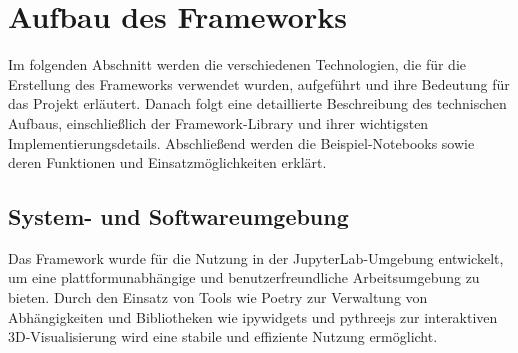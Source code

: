 \section{Aufbau des Frameworks}
Im folgenden Abschnitt werden die verschiedenen Technologien, die für die Erstellung des Frameworks verwendet wurden,
aufgeführt und ihre Bedeutung für das Projekt erläutert. Danach folgt eine detaillierte Beschreibung des technischen Aufbaus,
einschließlich der Framework-Library und ihrer wichtigsten Implementierungsdetails.
Abschließend werden die Beispiel-Notebooks sowie deren Funktionen und Einsatz\-möglichkeiten erklärt.


\subsection{System- und Softwareumgebung}
Das Framework wurde für die Nutzung in der JupyterLab-Umgebung entwickelt, um eine plattformunabhängige und benutzerfreundliche Arbeitsumgebung zu bieten.
Durch den Einsatz von Tools wie Poetry zur Verwaltung von Abhängigkeiten und Bibliotheken wie ipywidgets und pythreejs zur
interaktiven 3D-Visualisierung wird eine stabile und effiziente Nutzung ermöglicht.


